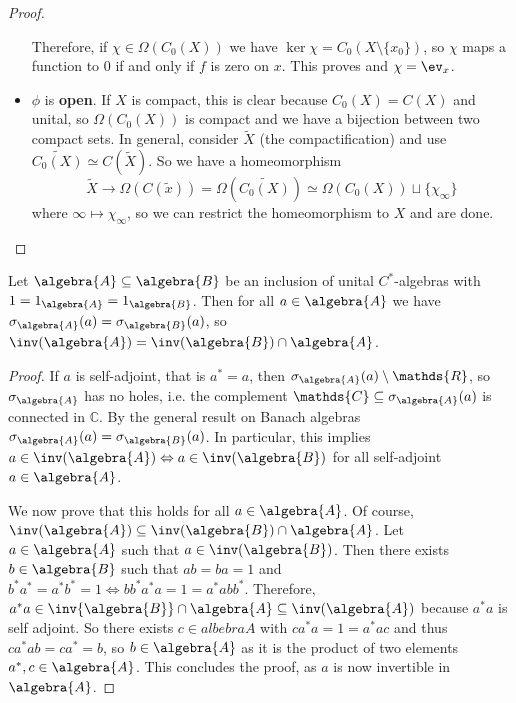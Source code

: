 \documentclass[a4paper]{article}
\begin{document}
\begin{proof}
\begin{itemize}
		Therefore, if $\chi \in \Omega(C_0(X))$ we have $\ker \chi = C_0(X\setminus\{x_0\})$, so $\chi$ maps a function to $0$ if and only if $f$ is zero on $x$.
		This proves and $\chi = \ev_x$.
		\item $\phi$ is \textbf{open}. If $X$ is compact, this is clear because $C_0(X) = C(X)$ and unital, so $\Omega(C_0(X))$ is compact and we have a bijection between two compact sets.
		In general, consider $\tilde{X}$ (the compactification) and use $\widetilde{C_0(X)} \simeq C(\tilde{X})$. So we have a homeomorphism 
		\begin{equation*}
			\tilde{X} \to \Omega(C(\tilde{x})) = \Omega(\widetilde{C_0(X)}) \simeq \Omega(C_0(X)) \sqcup \{\chi_\infty\}
		\end{equation*}
		where $\infty \mapsto \chi_\infty$, so we can restrict the homeomorphism to $X$ and are done.
	\end{itemize}
\end{proof}

\begin{theorem}
	Let $\algebra{A} \subseteq \algebra{B}$ be an inclusion of unital $C^*$-algebras with $1 = 1_\algebra{A} = 1_\algebra{B}$. Then for all $a \in \algebra{A}$ we have $\sigma_\algebra{A}(a) = \sigma_\algebra{B}(a)$, so $\inv(\algebra{A}) = \inv(\algebra{B}) \cap \algebra{A}$.
\end{theorem}

\begin{proof}
	If $a$ is self-adjoint, that is $a^* = a$, then $\sigma_\algebra{A}(a) \setminus \mathds{R}$, so $\sigma_\algebra{A}$ has no holes, i.e. the complement $\mathds{C} \subseteq \sigma_\algebra{A}(a)$ is connected in $\mathds{C}$.
	By the general result on Banach algebras $\sigma_\algebra{A}(a) = \sigma_\algebra{B}(a)$.
	In particular, this implies $a \in \inv(\algebra{A}) \iff a \in \inv(\algebra{B})$ for all self-adjoint $a \in \algebra{A}$.
	
	We now prove that this holds for all $a \in \algebra{A}$.
	Of course, $\inv(\algebra{A}) \subseteq \inv(\algebra{B}) \cap \algebra{A}$.
	Let $a \in \algebra{A}$ such that $a \in \inv(\algebra{B})$.
	Then there exists $b \in \algebra{B}$ such that $ab = ba = 1$ and $b^*a^* = a^* b^* = 1 \iff bb^* a^* a = 1 = a^*abb^*$. Therefore, $a^* a \in \inv{\algebra{B}} \cap \algebra{A} \subseteq \inv(\algebra{A})$ because $a^* a$ is self adjoint.
	So there exists $c \in albebra{A}$ with $c a^* a = 1 = a^* a c$ and thus $c a^* a b = c a^* = b$, so $b \in \algebra{A}$ as it is the product of two elements $a^*, c \in \algebra{A}$.
	This concludes the proof, as $a$ is now invertible in $\algebra{A}$.	
\end{proof}
\end{document}
